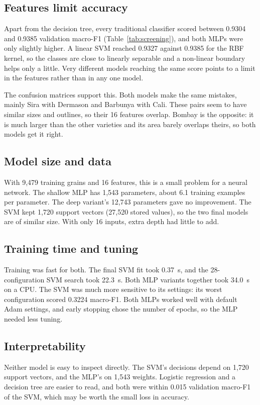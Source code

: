 \documentclass[conference,letterpaper]{IEEEtran}
\begin{document}
\subsection{Features limit accuracy}
Apart from the decision tree, every traditional classifier scored between 0.9304 and 0.9385 validation macro-F1 (Table~\ref{tab:screening}), and both MLPs were only slightly higher. A linear SVM reached 0.9327 against 0.9385 for the RBF kernel, so the classes are close to linearly separable and a non-linear boundary helps only a little. Very different models reaching the same score points to a limit in the features rather than in any one model.

The confusion matrices support this. Both models make the same mistakes, mainly Sira with Dermason and Barbunya with Cali. These pairs seem to have similar sizes and outlines, so their 16 features overlap. Bombay is the opposite: it is much larger than the other varieties and its area barely overlaps theirs, so both models get it right.

\subsection{Model size and data}
With 9,479 training grains and 16 features, this is a small problem for a neural network. The shallow MLP has 1,543 parameters, about 6.1 training examples per parameter. The deep variant's 12,743 parameters gave no improvement. The SVM kept 1,720 support vectors (27,520 stored values), so the two final models are of similar size. With only 16 inputs, extra depth had little to add.

\subsection{Training time and tuning}
Training was fast for both. The final SVM fit took 0.37~s, and the 28-configuration SVM search took 22.3~s. Both MLP variants together took 34.0~s on a CPU. The SVM was much more sensitive to its settings: its worst configuration scored 0.3224 macro-F1. Both MLPs worked well with default Adam settings, and early stopping chose the number of epochs, so the MLP needed less tuning.

\subsection{Interpretability}
Neither model is easy to inspect directly. The SVM's decisions depend on 1,720 support vectors, and the MLP's on 1,543 weights. Logistic regression and a decision tree are easier to read, and both were within 0.015 validation macro-F1 of the SVM, which may be worth the small loss in accuracy.
\end{document}

